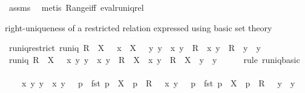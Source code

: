 \begin{isabellebody}
%
\isatagproof
{}\isamarkupfalse%
\ assms\ \isamarkupfalse%
\ {\isacharparenleft}metis\ Range{\isacharunderscore}iff\ eval{\isacharunderscore}runiq{\isacharunderscore}rel{\isacharparenright}%
\endisatagproof
{\isafoldproof}%
%
\isadelimproof
%
\endisadelimproof
%
\begin{isamarkuptext}%
right-uniqueness of a restricted relation expressed using basic set theory%
\end{isamarkuptext}%
\isamarkuptrue%
\isamarkupfalse%
\ runiq{\isacharunderscore}restrict{\isacharcolon}\ {\isachardoublequoteopen}runiq\ {\isacharparenleft}R\ {\isacharbar}{\isacharbar}\ X{\isacharparenright}\ {\isasymlongleftrightarrow}\ {\isacharparenleft}{\isasymforall}\ x\ {\isasymin}\ X\ {\isachardot}\ {\isasymforall}\ y\ y{\isacharprime}\ {\isachardot}\ {\isacharparenleft}x{\isacharcomma}\ y{\isacharparenright}\ {\isasymin}\ R\ {\isasymand}\ {\isacharparenleft}x{\isacharcomma}\ y{\isacharprime}{\isacharparenright}\ {\isasymin}\ R\ {\isasymlongrightarrow}\ y\ {\isacharequal}\ y{\isacharprime}{\isacharparenright}{\isachardoublequoteclose}\isanewline
%
\isadelimproof
%
\endisadelimproof
%
\isatagproof
{}\isamarkupfalse%
\ {\isacharminus}\isanewline
\ \ \isamarkupfalse%
\ {\isachardoublequoteopen}runiq\ {\isacharparenleft}R\ {\isacharbar}{\isacharbar}\ X{\isacharparenright}\ {\isasymlongleftrightarrow}\ {\isacharparenleft}{\isasymforall}\ x\ y\ y{\isacharprime}\ {\isachardot}\ {\isacharparenleft}x{\isacharcomma}\ y{\isacharparenright}\ {\isasymin}\ R\ {\isacharbar}{\isacharbar}\ X\ {\isasymand}\ {\isacharparenleft}x{\isacharcomma}\ y{\isacharprime}{\isacharparenright}\ {\isasymin}\ R\ {\isacharbar}{\isacharbar}\ X\ {\isasymlongrightarrow}\ y\ {\isacharequal}\ y{\isacharprime}{\isacharparenright}{\isachardoublequoteclose}\isanewline
\ \ \ \ \isamarkupfalse%
\ {\isacharparenleft}rule\ runiq{\isacharunderscore}basic{\isacharparenright}\isanewline
\ \ \isamarkupfalse%
\ \isamarkupfalse%
\ {\isachardoublequoteopen}{\isasymdots}\ {\isasymlongleftrightarrow}\ {\isacharparenleft}{\isasymforall}\ x\ y\ y{\isacharprime}\ {\isachardot}\ {\isacharparenleft}x{\isacharcomma}\ y{\isacharparenright}\ {\isasymin}\ {\isacharbraceleft}\ p\ {\isachardot}\ fst\ p\ {\isasymin}\ X\ {\isasymand}\ p\ {\isasymin}\ R\ {\isacharbraceright}\ {\isasymand}\ {\isacharparenleft}x{\isacharcomma}\ y{\isacharprime}{\isacharparenright}\ {\isasymin}\ {\isacharbraceleft}\ p\ {\isachardot}\ fst\ p\ {\isasymin}\ X\ {\isasymand}\ p\ {\isasymin}\ R\ {\isacharbraceright}\ {\isasymlongrightarrow}\ y\ {\isacharequal}\ y{\isacharprime}{\isacharparenright}{\isachardoublequoteclose}\isanewline

\end{isabellebody}
